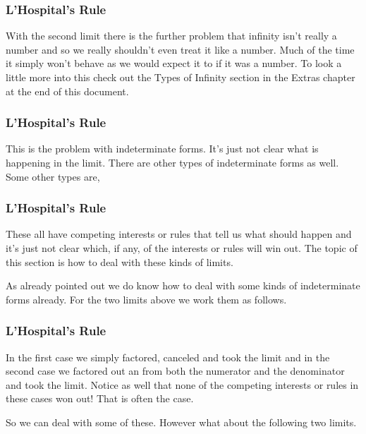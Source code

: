 \documentclass{beamer}
\begin{document}
\begin{frame}
	\frametitle{L’Hospital’s Rule}
	\large 
With the second limit there is the further problem that infinity isn’t really a number and so we really shouldn’t even treat it like a number.  Much of the time it simply won’t behave as we would expect it to if it was a number.  To look a little more into this check out the Types of Infinity section in the Extras chapter at the end of this document.
\end{frame}
\begin{frame}
	\frametitle{L’Hospital’s Rule}
	\large 
This is the problem with indeterminate forms.  It’s just not clear what is happening in the limit.  There are other types of indeterminate forms as well.  Some other types are,
 
 
\end{frame}
\begin{frame}
	\frametitle{L’Hospital’s Rule}
	\large

These all have competing interests or rules that tell us what should happen and it’s just not clear which, if any, of the interests or rules will win out.  The topic of this section is how to deal with these kinds of limits.
 
As already pointed out we do know how to deal with some kinds of indeterminate forms already.  For the two limits above we work them as follows.

 
\end{frame}
\begin{frame}
	\frametitle{L’Hospital’s Rule}
	\large
 
 
In the first case we simply factored, canceled and took the limit and in the second case we factored out an  from both the numerator and the denominator and took the limit.  Notice as well that none of the competing interests or rules in these cases won out!  That is often the case.
 
So we can deal with some of these.  However what about the following two limits.

 
\end{frame}
\end{document}
